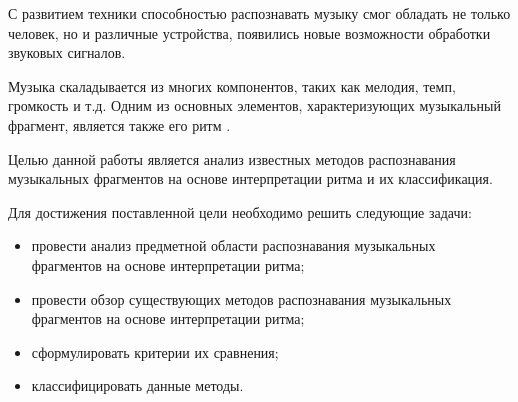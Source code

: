 С развитием техники способностью распознавать музыку смог обладать не только человек, но и различные устройства, появились новые возможности обработки звуковых сигналов. 

Музыка скаладывается из многих компонентов, таких как мелодия, темп, громкость и т.д. Одним из основных элементов, характеризующих музыкальный фрагмент, является также его ритм \cite{bib15}.

Целью данной работы является анализ известных методов распознавания музыкальных фрагментов на основе интерпретации ритма и их классификация.

Для достижения поставленной цели необходимо решить следующие задачи:
\begin{itemize}
    \item провести анализ предметной области распознавания музыкальных \\фрагментов на основе интерпретации ритма;
    \item провести обзор существующих методов распознавания музыкальных \\фрагментов на основе интерпретации ритма;
    \item сформулировать критерии их сравнения;
    \item классифицировать данные методы.
\end{itemize}
